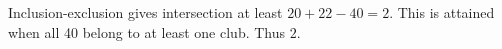 Inclusion-exclusion gives intersection at least $20+22-40=2$. This is attained when all 40 belong to at least one club. Thus $\boxed2$.
